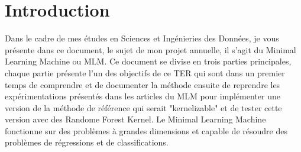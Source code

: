 \documentclass[12pt,a4paper]{report}
\begin{document}
\tableofcontents
{\color{MidnightBlue}\chapter{Introduction}}
\par Dans le cadre de mes études en Sciences et Ingénieries des Données, je vous présente dans ce document, le sujet de mon projet annuelle, il s'agit du Minimal Learning Machine ou MLM. Ce document se divise en trois parties principales, chaque partie présente l'un des objectifs de ce TER qui sont dans un premier temps de comprendre et de documenter la méthode ensuite de reprendre les expérimentations présentés dans les articles du MLM pour implémenter une version de la méthode de référence qui serait "kernelizable" et de tester cette version avec des Randome Forest Kernel. Le Minimal Learning Machine fonctionne sur des problèmes à grandes dimensions et capable de résoudre des problèmes de régressions et de classifications.
\end{document}
